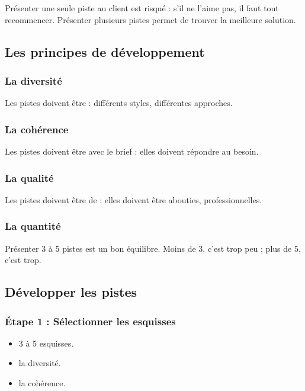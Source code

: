 Présenter une seule piste au client est risqué : s'il ne l'aime pas, il faut tout recommencer. Présenter plusieurs pistes permet de trouver la meilleure solution.

\subsection{Les principes de développement}

\subsubsection{La diversité}

Les pistes doivent être  : différents styles, différentes approches.

\subsubsection{La cohérence}

Les pistes doivent être  avec le brief : elles doivent répondre au besoin.

\subsubsection{La qualité}

Les pistes doivent être de  : elles doivent être abouties, professionnelles.

\subsubsection{La quantité}

Présenter 3 à 5 pistes est un bon équilibre. Moins de 3, c'est trop peu ; plus de 5, c'est trop.

\subsection{Développer les pistes}

\subsubsection{Étape 1 : Sélectionner les esquisses}

\begin{itemize}
    \item {} 3 à 5 esquisses.
    \item {} la diversité.
    \item {} la cohérence.
\end{itemize}

